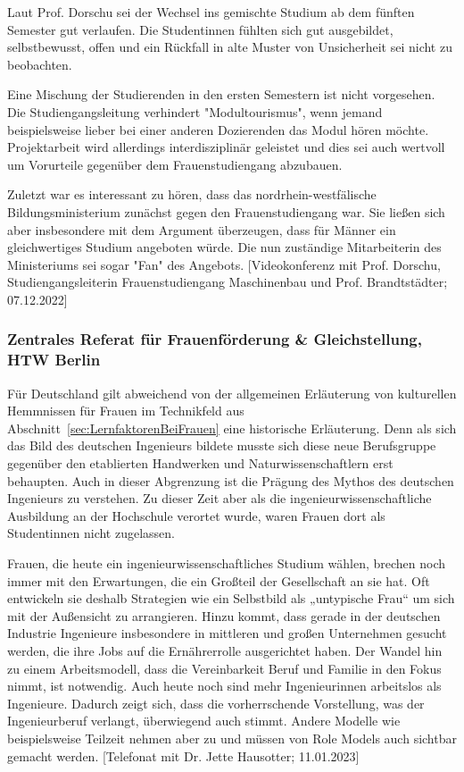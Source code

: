 \documentclass[a4paper, 12 pt]{IEEEtran}
\begin{document}
Laut Prof. Dorschu sei der Wechsel ins gemischte Studium ab dem fünften Semester gut verlaufen. Die Studentinnen fühlten sich gut ausgebildet, selbstbewusst, offen und ein Rückfall in alte Muster von Unsicherheit sei nicht zu beobachten.

Eine Mischung der Studierenden in den ersten Semestern ist nicht vorgesehen. Die Studiengangsleitung verhindert "Modultourismus", wenn jemand beispielsweise lieber bei einer anderen Dozierenden das Modul hören möchte. Projektarbeit wird allerdings interdisziplinär geleistet und dies sei auch wertvoll um Vorurteile gegenüber dem Frauenstudiengang abzubauen.

Zuletzt war es interessant zu hören, dass das nordrhein-westfälische Bildungsministerium zunächst gegen den Frauenstudiengang war. Sie ließen sich aber insbesondere mit dem Argument überzeugen, dass für Männer ein gleichwertiges Studium angeboten würde. Die nun zuständige Mitarbeiterin des Ministeriums sei sogar "Fan" des Angebots.
[Videokonferenz mit Prof. Dorschu, Studiengangsleiterin Frauenstudiengang Maschinenbau und Prof. Brandtstädter; 07.12.2022]

\subsubsection{Zentrales Referat für Frauenförderung \& Gleichstellung, HTW Berlin}
Für Deutschland gilt abweichend von der allgemeinen Erläuterung von kulturellen Hemmnissen für Frauen im Technikfeld aus Abschnitt~\ref{sec:LernfaktorenBeiFrauen} eine historische Erläuterung. Denn als sich das Bild des deutschen Ingenieurs bildete musste sich diese neue Berufsgruppe gegenüber den etablierten Handwerken und Naturwissenschaftlern erst behaupten. Auch in dieser Abgrenzung ist die Prägung des Mythos des deutschen Ingenieurs zu verstehen. Zu dieser Zeit aber als die ingenieurwissenschaftliche Ausbildung an der Hochschule verortet wurde, waren Frauen dort als Studentinnen nicht zugelassen. 

Frauen, die heute ein ingenieurwissenschaftliches Studium wählen, brechen noch immer mit den Erwartungen, die ein Großteil der Gesellschaft an sie hat. Oft entwickeln sie deshalb Strategien wie ein Selbstbild als „untypische Frau“ um sich mit der Außensicht zu arrangieren.  
Hinzu kommt, dass gerade in der deutschen Industrie Ingenieure insbesondere in mittleren und großen Unternehmen gesucht werden, die ihre Jobs auf die Ernährerrolle ausgerichtet haben. Der Wandel hin zu einem Arbeitsmodell, dass die Vereinbarkeit Beruf und Familie in den Fokus nimmt, ist notwendig. Auch heute noch sind mehr Ingenieurinnen arbeitslos als Ingenieure. Dadurch zeigt sich, dass die vorherrschende Vorstellung, was der Ingenieurberuf verlangt, überwiegend auch stimmt. Andere Modelle wie beispielsweise Teilzeit nehmen aber zu und müssen von Role Models auch sichtbar gemacht werden.
[Telefonat mit Dr. Jette Hausotter; 11.01.2023]
\end{document}
